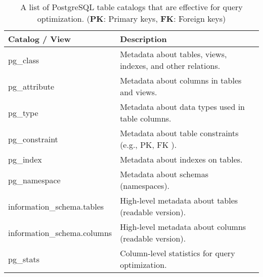 \begin{table*}[h!]
\centering
\caption[A list of PostgreSQL table catalogs.]{A list of PostgreSQL table catalogs that are effective for query optimization. (\textbf{PK}: Primary keys, \textbf{FK}: Foreign keys) \cite{noauthor_overview_2021}}
\begin{tabularx}{\textwidth}{ll}
    \toprule   
   \textbf{Catalog / View}&\textbf{Description}\\
    \midrule
pg\_class&Metadata about tables, views, indexes, and other relations.\\
pg\_attribute&Metadata about columns in tables and views.\\
pg\_type&Metadata about data types used in table columns.\\
pg\_constraint&Metadata about table constraints (e.g., PK, FK ).\\
pg\_index&Metadata about indexes on tables.\\
pg\_namespace&Metadata about schemas (namespaces).\\
information\_schema.tables&High-level metadata about tables (readable version).\\
information\_schema.columns&High-level metadata about columns (readable version).\\
pg\_stats&Column-level statistics for query optimization.\\
      \bottomrule
\end{tabularx}
 \label{tab:tbl-pg-catalogs}
\end{table*}
